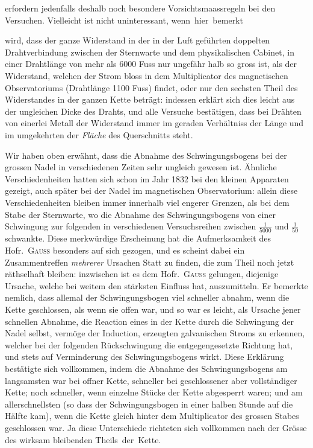 erfordern jedenfalls deshalb noch besondere Vorsichtsmaassregeln bei den Versuchen. Vielleicht ist nicht uninteressant, wenn~hier~bemerkt
\par\clearpage
{}
\noindent wird, dass der ganze Widerstand in der in der Luft geführten doppelten Drahtverbindung zwischen der Sternwarte und dem physikalischen Cabinet, in einer Drahtlänge von mehr als 6000 Fuss nur ungefähr halb so gross ist, als der Widerstand, welchen der Strom bloss in dem Multiplicator des magnetischen Observatoriums (Drahtlänge 1100 Fuss) findet, oder nur den sechsten Theil des Widerstandes in der ganzen Kette beträgt: indessen erklärt sich dies leicht aus der ungleichen Dicke des Drahts, und alle Versuche bestätigen, dass bei Drähten von einerlei Metall der Widerstand immer im geraden Verhältniss der Länge und im umgekehrten der \textit{Fläche} des Querschnitts steht.

Wir haben oben erwähnt, dass die Abnahme des Schwingungsbogens bei der grossen Nadel in verschiedenen Zeiten sehr ungleich gewesen ist. Ähnliche Verschiedenheiten hatten sich schon im Jahr 1832 bei den kleinen Apparaten gezeigt, auch später bei der Nadel im magnetischen Observatorium: allein diese Verschiedenheiten bleiben immer innerhalb viel engerer Grenzen, als bei dem Stabe der Sternwarte, wo die Abnahme des Schwingungsbogens von einer Schwingung zur folgenden in verschiedenen Versuchsreihen zwischen $\frac{1}{5000}$ und $\frac{1}{50}$ schwankte. Diese merkwürdige Erscheinung hat die Aufmerksamkeit des Hofr.\ \textsc{Gauss} besonders auf sich gezogen, und es scheint dabei ein Zusammentreffen \textit{mehrerer} Ursachen Statt zu finden, die zum Theil noch jetzt räthselhaft bleiben: inzwischen ist es dem Hofr.\ \textsc{Gauss} gelungen, diejenige Ursache, welche bei weitem den stärksten Einfluss hat, auszumitteln. Er bemerkte nemlich, dass allemal der Schwingungsbogen viel schneller abnahm, wenn die Kette geschlossen, als wenn sie offen war, und so war es leicht, als Ursache jener schnellen Abnahme, die Reaction eines in der Kette durch die Schwingung der Nadel selbst, vermöge der Induction, erzeugten galvanischen Stroms zu erkennen, welcher bei der folgenden Rückschwingung die entgegengesetzte Richtung hat, und stets auf Verminderung des Schwingungsbogens wirkt. Diese Erklärung bestätigte sich vollkommen, indem die Abnahme des Schwingungsbogens am langsamsten war bei offner Kette, schneller bei geschlossener aber vollständiger Kette; noch schneller, wenn einzelne Stücke der Kette abgesperrt waren; und am allerschnellsten (so dass der Schwingungsbogen in einer halben Stunde auf die Hälfte kam), wenn die Kette gleich hinter dem Multiplicator des grossen Stabes geschlossen war. Ja diese Unterschiede richteten sich vollkommen nach der Grösse des wirksam bleibenden Theils~der~Kette.

